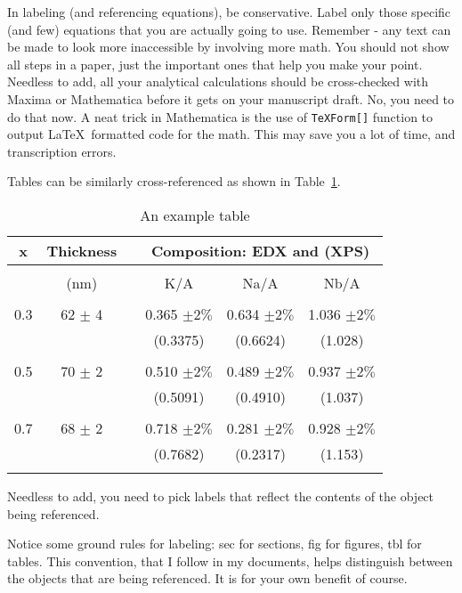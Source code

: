 \documentclass[12 pt]{article}
\begin{document}
In labeling (and referencing equations), be conservative. Label only those specific (and few) equations that you are actually going to use. Remember - any text can be made to look more inaccessible by involving more math. You should not show all steps in a paper, just the important ones that help you make your point. Needless to add, all your analytical calculations should be cross-checked with Maxima or Mathematica before it gets on your manuscript draft. No, you need to do that now. A neat trick in Mathematica is the use of \verb|TeXForm[]| function to output \LaTeX\ formatted code for the math. This may save you a lot of time, and transcription errors.

Tables can be similarly cross-referenced as shown in Table~\ref{tbl:ratio}.

\begin{table}
  \caption{An example table}
  \label{tbl:ratio}
  \begin{center}
    \begin{tabular}{cccccc}
      x  & Thickness & & \multicolumn{3}{c}{Composition: EDX and (XPS)} \\
      \hline \\
         & (nm) & & K/A & Na/A & Nb/A \\
      \hline \\
      0.3 & 62 $\pm$ 4 & & 0.365 $\pm 2\%$ & 0.634 $\pm 2\%$ & 1.036 $\pm 2\%$ \\
         & & & (0.3375) & (0.6624) & (1.028) \\
      \hline \\
      0.5 & 70 $\pm$ 2 & & 0.510 $\pm 2\%$ & 0.489 $\pm 2\%$ & 0.937 $\pm 2\%$ \\
         & & & (0.5091) & (0.4910) & (1.037) \\
      \hline \\
      0.7 & 68 $\pm$ 2 & & 0.718 $\pm 2\%$ & 0.281 $\pm 2\%$ & 0.928 $\pm 2\%$ \\
         & & & (0.7682) & (0.2317) & (1.153) \\
      \hline \\
    \end{tabular}
  \end{center}
\end{table}

Needless to add, you need to pick labels that reflect the contents of the object being referenced.

Notice some ground rules for labeling: sec for sections, fig for figures, tbl for tables. This convention, that I follow in my documents, helps distinguish between the objects that are being referenced. It is for your own benefit of course.
\end{document}
